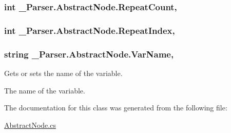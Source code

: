 \subsubsection[{\texorpdfstring{Repeat\+Count}{RepeatCount}}]{\setlength{\rightskip}{0pt plus 5cm}int \+\_\+Parser.\+Abstract\+Node.\+Repeat\+Count\hspace{0.3cm}{\ttfamily [get]}, {}}\hypertarget{class__1920_parser_1_1_abstract_node_a68d196e888509c7a603ea9f89124cd11}{}\label{class__1920_parser_1_1_abstract_node_a68d196e888509c7a603ea9f89124cd11}
\subsubsection[{\texorpdfstring{Repeat\+Index}{RepeatIndex}}]{\setlength{\rightskip}{0pt plus 5cm}int \+\_\+Parser.\+Abstract\+Node.\+Repeat\+Index\hspace{0.3cm}{\ttfamily [get]}, {}}\hypertarget{class__1920_parser_1_1_abstract_node_a727fdfa1025e8c672a28c60bef03d9b9}{}\label{class__1920_parser_1_1_abstract_node_a727fdfa1025e8c672a28c60bef03d9b9}
\subsubsection[{\texorpdfstring{Var\+Name}{VarName}}]{\setlength{\rightskip}{0pt plus 5cm}string \+\_\+Parser.\+Abstract\+Node.\+Var\+Name\hspace{0.3cm}{\ttfamily [get]}, {}}\hypertarget{class__1920_parser_1_1_abstract_node_ae4a8076d5cf940c9fa0b1a7fecdd4a6a}{}\label{class__1920_parser_1_1_abstract_node_ae4a8076d5cf940c9fa0b1a7fecdd4a6a}


Gets or sets the name of the variable. 

The name of the variable. 

The documentation for this class was generated from the following file\+:\begin{DoxyCompactItemize}
\item 
\hyperlink{_abstract_node_8cs}{Abstract\+Node.\+cs}\end{DoxyCompactItemize}
